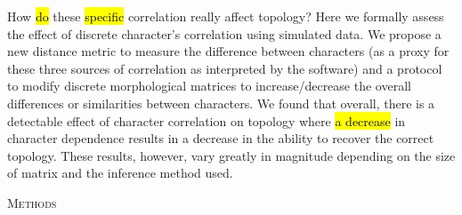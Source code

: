 \documentclass[12pt,letterpaper]{article}
\renewcommand{\section}[1]{%
\bigskip
\begin{center}
\begin{Large}
\normalfont\scshape #1
\medskip
\end{Large}
\end{center}}
\begin{document}
How \hl{do} these \hl{specific} correlation really affect topology?
Here we formally assess the effect of discrete character's correlation using simulated data.
We propose a new distance metric to measure the difference between characters (as a proxy for these three sources of correlation as interpreted by the software) and a protocol to modify discrete morphological matrices to increase/decrease the overall differences or similarities between characters.
We found that overall, there is a detectable effect of character correlation on topology where \hl{a decrease} in character dependence results in a decrease in the ability to recover the correct topology.
These results, however, vary greatly in magnitude depending on the size of matrix and the inference method used.

\section{Methods}
\end{document}
